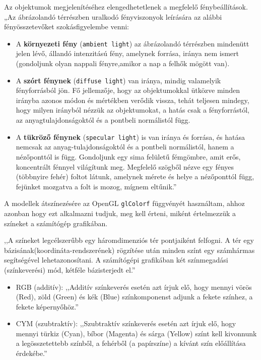 
Az objektumok megjelenítéséhez elengedhetetlenek a megfelelő fénybeállítások.\\

„Az ábrázolandó térrészben uralkodó fényviszonyok leírására az alábbi fényösszetevőket szokásfigyelembe venni:

\begin{itemize}
\item A {\bf környezeti fény} (\texttt{ambient light}) az ábrázolandó térrészben mindenütt jelen lévő, állandó intenzitású fény, amelynek forrása, iránya nem ismert (gondoljunk olyan nappali fényre,amikor a nap a felhők mögött van).
\item A {\bf szórt fénynek} (\texttt{diffuse light}) van iránya, mindig valamelyik fényforrásból jön. Fő jellemzője, hogy az objektumokkal ütközve minden irányba azonos módon és mértékben verődik vissza, tehát teljesen mindegy, hogy milyen irányból nézzük az objektumokat, a hatás csak a fényforrástól, az anyagtulajdonságoktól és a pontbeli normálistól függ.
\item A {\bf tükröző fénynek} (\texttt{specular light}) is van iránya és forrása, és hatása nemcsak az anyag-tulajdonságoktól és a pontbeli normálistól, hanem a nézőponttól is függ. Gondoljunk egy sima felületű fémgömbre, amit erős, koncentrált fénnyel világítunk meg. Megfelelő szögből nézve egy fényes (többnyire fehér) foltot látunk, amelynek mérete és helye a nézőponttól függ, fejünket mozgatva a folt is mozog, mígnem eltűnik.”
\end{itemize}


A modellek átszínezésére az OpenGL \texttt{glColorf} függvényét használtam, ahhoz azonban hogy ezt alkalmazni tudjuk, meg kell érteni, miként értelmezzük a színeket a számítógép grafikában.

,,A színeket legcélszerűbb egy háromdimenziós tér pontjaiként felfogni. A tér egy bázisának(koordináta-rendszerének) rögzítése után minden színt egy számhármas segítségével lehetazonosítani. A számítógépi grafikában két színmegadási (színkeverési) mód, kétféle bázisterjedt el.”
\begin{itemize}
\item  RGB (additív): ,,Additív színkeverés esetén azt írjuk elő, hogy mennyi vörös (Red), zöld (Green) és kék (Blue) színkomponenst adjunk a fekete színhez, a fekete képernyőhöz.”
\item CYM (szubtraktív): ,,Szubtraktív színkeverés esetén azt írjuk elő, hogy mennyi türkiz (Cyan), bíbor (Magenta) és sárga (Yellow) színt kell kivonnunk a legösszetettebb színből, a fehérből (a papírszíne) a kívánt szín előállítása érdekébe.”
\end{itemize}

